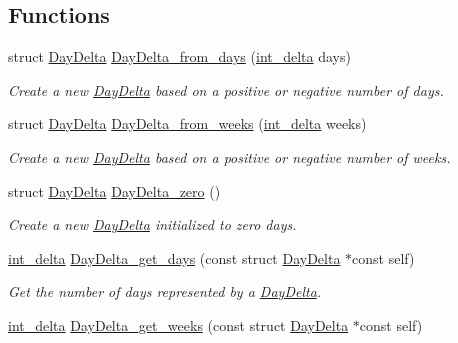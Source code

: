 \subsection*{\-Functions}
\begin{DoxyCompactItemize}
\item 
struct \hyperlink{structDayDelta}{\-Day\-Delta} \hyperlink{day-delta_8h_a50a5b111e380372e918e4d67f4b1814d}{\-Day\-Delta\-\_\-from\-\_\-days} (\hyperlink{types_8h_a10729255b1946fd4fb654b2fe814910b}{int\-\_\-delta} days)
\begin{DoxyCompactList}\small\item\em \-Create a new \hyperlink{structDayDelta}{\-Day\-Delta} based on a positive or negative number of days. \end{DoxyCompactList}\item 
struct \hyperlink{structDayDelta}{\-Day\-Delta} \hyperlink{day-delta_8h_ac44c70541cf4f255f25384194341ff07}{\-Day\-Delta\-\_\-from\-\_\-weeks} (\hyperlink{types_8h_a10729255b1946fd4fb654b2fe814910b}{int\-\_\-delta} weeks)
\begin{DoxyCompactList}\small\item\em \-Create a new \hyperlink{structDayDelta}{\-Day\-Delta} based on a positive or negative number of weeks. \end{DoxyCompactList}\item 
struct \hyperlink{structDayDelta}{\-Day\-Delta} \hyperlink{day-delta_8h_ab87d828518fe1bdc7e7662be3e5e6289}{\-Day\-Delta\-\_\-zero} ()
\begin{DoxyCompactList}\small\item\em \-Create a new \hyperlink{structDayDelta}{\-Day\-Delta} initialized to zero days. \end{DoxyCompactList}\item 
\hyperlink{types_8h_a10729255b1946fd4fb654b2fe814910b}{int\-\_\-delta} \hyperlink{day-delta_8h_a1a191ca724a310625caee1f2250796d9}{\-Day\-Delta\-\_\-get\-\_\-days} (const struct \hyperlink{structDayDelta}{\-Day\-Delta} $\ast$const self)
\begin{DoxyCompactList}\small\item\em \-Get the number of days represented by a \hyperlink{structDayDelta}{\-Day\-Delta}. \end{DoxyCompactList}\item 
\hyperlink{types_8h_a10729255b1946fd4fb654b2fe814910b}{int\-\_\-delta} \hyperlink{day-delta_8h_a20ae51668ac186eb785cbc44aec6f810}{\-Day\-Delta\-\_\-get\-\_\-weeks} (const struct \hyperlink{structDayDelta}{\-Day\-Delta} $\ast$const self)

\end{DoxyCompactItemize}
